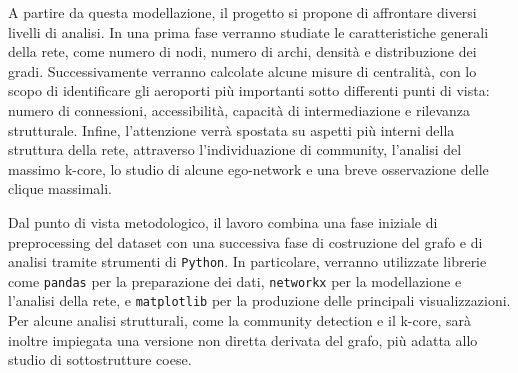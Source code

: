 A partire da questa modellazione, il progetto si propone di affrontare diversi livelli di analisi. In una prima fase verranno studiate le caratteristiche generali della rete, come numero di nodi, numero di archi, densità e distribuzione dei gradi. Successivamente verranno calcolate alcune misure di centralità, con lo scopo di identificare gli aeroporti più importanti sotto differenti punti di vista: numero di connessioni, accessibilità, capacità di intermediazione e rilevanza strutturale. Infine, l’attenzione verrà spostata su aspetti più interni della struttura della rete, attraverso l’individuazione di community, l’analisi del massimo k-core, lo studio di alcune ego-network e una breve osservazione delle clique massimali.

Dal punto di vista metodologico, il lavoro combina una fase iniziale di preprocessing del dataset con una successiva fase di costruzione del grafo e di analisi tramite strumenti di \texttt{Python}. In particolare, verranno utilizzate librerie come \texttt{pandas} per la preparazione dei dati, \texttt{networkx} per la modellazione e l’analisi della rete, e \texttt{matplotlib} per la produzione delle principali visualizzazioni. Per alcune analisi strutturali, come la community detection e il k-core, sarà inoltre impiegata una versione non diretta derivata del grafo, più adatta allo studio di sottostrutture coese.